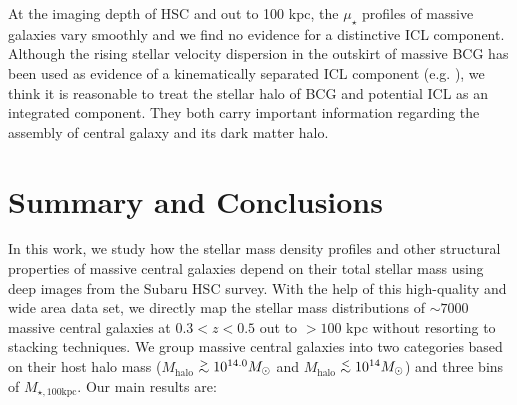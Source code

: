 \documentclass[a4paper,fleqn,usenatbib]{mnras}
\def\simlt{\lower.5ex\hbox{$\; \buildrel < \over {\sim} \;$}}
\def\simgt{\lower.5ex\hbox{$\; \buildrel > \over {\sim} \;$}}
\def\mhalo{{$M_{\mathrm{halo}}$}}
\def\mtot{{$M_{\star,100\mathrm{kpc}}$}}
\def\mden{{$\mu_{\star}$}}
\begin{document}
    At the imaging depth of HSC and out to 100 kpc, the \mden{} profiles of massive 
    galaxies vary smoothly and we find no evidence for a distinctive ICL component. 
    Although the rising stellar velocity dispersion in the outskirt of massive BCG
    has been used as evidence of a kinematically separated ICL component (e.g. 
    \citealt{Dressler1979, Carter1999, Kelson2002, Bender2015, Longobardi2015}), 
    we think it is reasonable to treat the stellar halo of BCG and potential ICL as 
    an integrated component. 
    They both carry important information regarding the assembly of central galaxy 
    and its dark matter halo. 
    

\section{Summary and Conclusions}
    \label{sec:summary}
    
    In this work, we study how the stellar mass density profiles and other structural
    properties of massive central galaxies depend on their total stellar mass using 
    deep images from the Subaru HSC survey. 
    With the help of this high-quality and wide area data set, we directly map the 
    stellar mass distributions of ${\sim}7000$ massive central galaxies at 
    $0.3 < z < 0.5$ out to $>100$ kpc without resorting to stacking techniques. 
    We group massive central galaxies into two categories based on their host halo 
    mass (\mhalo{}$\simgt 10^{14.0} M_{\odot}$ and \mhalo{}$\simlt 10^{14} M_{\odot}$)
    and three bins of \mtot{}.  
    Our main results are:  
    
\end{document}
